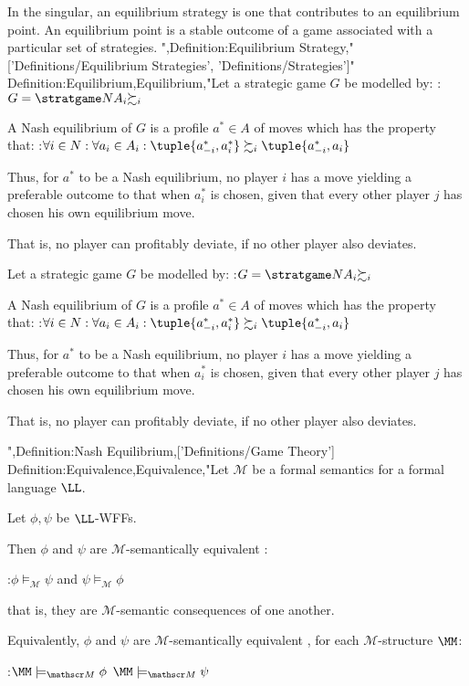 In the singular, an equilibrium strategy is one that contributes to an equilibrium point.
An equilibrium point is a stable outcome of a game associated with a particular set of strategies.
",Definition:Equilibrium Strategy,"['Definitions/Equilibrium Strategies', 'Definitions/Strategies']"
Definition:Equilibrium,Equilibrium,"Let a strategic game $G$ be modelled by:
:$G = \stratgame N {A_i} {\succsim_i}$


A Nash equilibrium of $G$ is a profile $a^* \in A$ of moves which has the property that:
:$\forall i \in N: \forall a_i \in A_i: \tuple {a^*_{-i}, a^*_i} \succsim_i \tuple {a^*_{-i}, a_i}$


Thus, for $a^*$ to be a Nash equilibrium, no player $i$ has a move yielding a preferable outcome to that when $a^*_i$ is chosen, given that every other player $j$ has chosen his own equilibrium move.

That is, no player can profitably deviate, if no other player also deviates.


Let a strategic game $G$ be modelled by:
:$G = \stratgame N {A_i} {\succsim_i}$


A Nash equilibrium of $G$ is a profile $a^* \in A$ of moves which has the property that:
:$\forall i \in N: \forall a_i \in A_i: \tuple {a^*_{-i}, a^*_i} \succsim_i \tuple {a^*_{-i}, a_i}$


Thus, for $a^*$ to be a Nash equilibrium, no player $i$ has a move yielding a preferable outcome to that when $a^*_i$ is chosen, given that every other player $j$ has chosen his own equilibrium move.

That is, no player can profitably deviate, if no other player also deviates.


",Definition:Nash Equilibrium,['Definitions/Game Theory']
Definition:Equivalence,Equivalence,"Let $\mathscr M$ be a formal semantics for a formal language $\LL$.

Let $\phi, \psi$ be $\LL$-WFFs.


Then $\phi$ and $\psi$ are $\mathscr M$-semantically equivalent :

:$\phi \models_{\mathscr M} \psi$ and $\psi \models_{\mathscr M} \phi$

that is,  they are $\mathscr M$-semantic consequences of one another.


Equivalently, $\phi$ and $\psi$ are $\mathscr M$-semantically equivalent , for each $\mathscr M$-structure $\MM$:

:$\MM \models_{\mathscr M} \phi$  $\MM \models_{\mathscr M} \psi$




